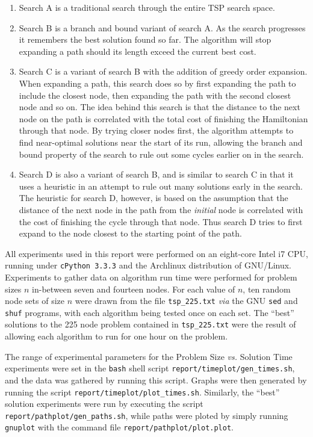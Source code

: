 \documentclass{article}
\begin{document}
\begin{enumerate}
	\item Search A is a traditional search through the entire TSP search space.
	\item Search B is a branch and bound variant of search A. As the search progresses it remembers the best solution found so far. The algorithm will stop expanding a path should its length exceed the current best cost.
	\item Search C is a variant of search B with the addition of greedy order expansion. When expanding a path, this search does so by first expanding the path to include the closest node, then expanding the path with the second closest node and so on. The idea behind this search is that the distance to the next node on the path is correlated with the total cost of finishing the Hamiltonian through that node. By trying closer nodes first, the algorithm attempts to find near-optimal solutions near the start of its run, allowing the branch and bound property of the search to rule out some cycles earlier on in the search.
	\item Search D is also a variant of search B, and is similar to search C in that it uses a heuristic in an attempt to rule out many solutions early in the search. The heuristic for search D, however, is based on the assumption that the distance of the next node in the path from the {\it initial} node is correlated with the cost of finishing the cycle through that node. Thus search D tries to first expand to the node closest to the starting point of the path.
\end{enumerate}


All experiments used in this report were performed on an eight-core Intel i7 CPU, running under {\tt cPython 3.3.3} and the Archlinux distribution of GNU/Linux. \\

Experiments to gather data on algorithm run time were performed for problem sizes \(n\) in-between seven and fourteen nodes. For each value of \(n\), ten random node sets of size \(n\) were drawn from the file {\tt tsp\_225.txt} {\it via} the GNU {\tt sed} and {\tt shuf} programs, with each algorithm being tested once on each set.  The ``best'' solutions to the 225 node problem contained in {\tt tsp\_225.txt} were the result of allowing each algorithm to run for one hour on the problem.

The range of experimental parameters for the Problem Size {\it vs.} Solution Time experiments were set in the {\tt bash} shell script {\tt report/timeplot/gen\_times.sh}, and the data was gathered by running this script. Graphs were then generated by running the script {\tt report/timeplot/plot\_times.sh}. Similarly, the ``best'' solution experiments were run by executing the script {\tt report/pathplot/gen\_paths.sh}, while paths were ploted by simply running {\tt gnuplot} with the command file {\tt report/pathplot/plot.plot}.
\end{document}
